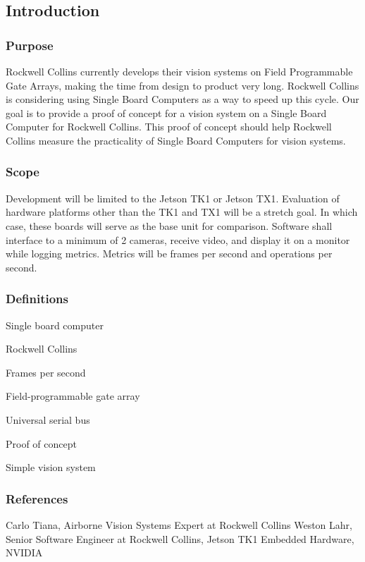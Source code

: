 \subsection{Introduction}
\subsubsection{Purpose}
Rockwell Collins currently develops their vision systems on Field Programmable Gate Arrays, making the time from design to product very long.  Rockwell Collins is considering using Single Board Computers as a way to speed up this cycle.
Our goal is to provide a proof of concept for a vision system on a Single Board Computer for Rockwell Collins. This proof of concept should help Rockwell Collins measure the practicality of Single Board Computers for vision systems.\\

\subsubsection{Scope}
Development will be limited to the Jetson TK1 or Jetson TX1. Evaluation of hardware platforms other than the TK1 and TX1 will be a stretch goal. In which case, these boards will serve as the base unit for comparison. Software shall interface to a minimum of 2 cameras, receive video, and display it on a monitor while logging metrics. Metrics will be frames per second and operations per second.\\

\subsubsection{Definitions}
\begin{description}[leftmargin=2cm,labelindent=2cm]
	\item [SBC] Single board computer
	\item [RC] Rockwell Collins
	\item [FPS] Frames per second
	\item [FPGA] Field-programmable gate array
	\item [USB] Universal serial bus
	\item [PoC] Proof of concept
	\item [SVS] Simple vision system\\
\end{description}

\subsubsection{References}
Carlo Tiana, Airborne Vision Systems Expert at Rockwell Collins
Weston Lahr, Senior Software Engineer at Rockwell Collins,
Jetson TK1 Embedded Hardware, NVIDIA\\

